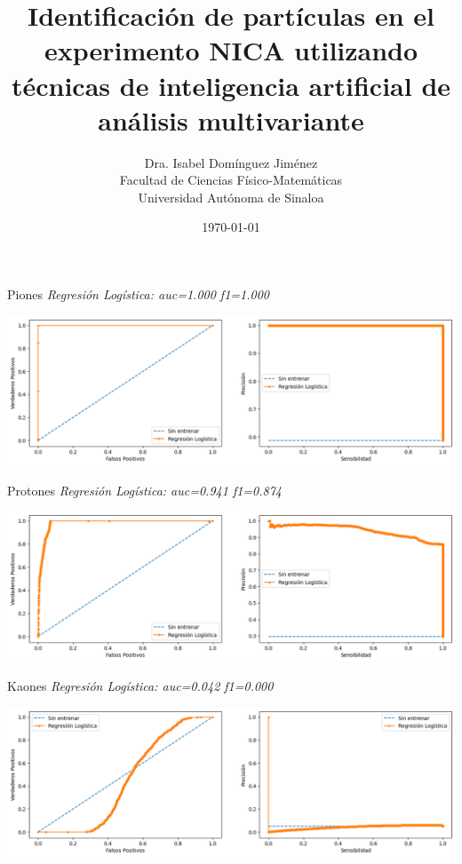 \documentclass{beamer}
\title[ML PID]
{Identificación de partículas en el experimento NICA utilizando técnicas de inteligencia artificial de análisis multivariante}
\author[Dra. Isabel Domínguez Jiménez]
{Dra. Isabel Domínguez Jiménez \\
Facultad de Ciencias Físico-Matemáticas \\
Universidad Autónoma de Sinaloa }
\institute[FCFM-UAS]
{~}
\date[]
{\today}
\begin{document}
\begin{frame}
  \titlepage
\end{frame}


\begin{frame}{Piones}
\textit{Regresión Logística: auc=1.000 f1=1.000 }

\begin{center}\includegraphics[scale=0.35]{figure/pi.png}\end{center}

\end{frame}
\begin{frame}{Protones}
	\textit{Regresión Logística: auc=0.941 f1=0.874}
	
	\begin{center}\includegraphics[scale=0.35]{figure/p.png}\end{center}

\end{frame}
\begin{frame}{Kaones}
	\textit{Regresión Logística: auc=0.042 f1=0.000}
	
	\begin{center}\includegraphics[scale=0.35]{figure/k.png}\end{center}
	
\end{frame}
\end{document}
